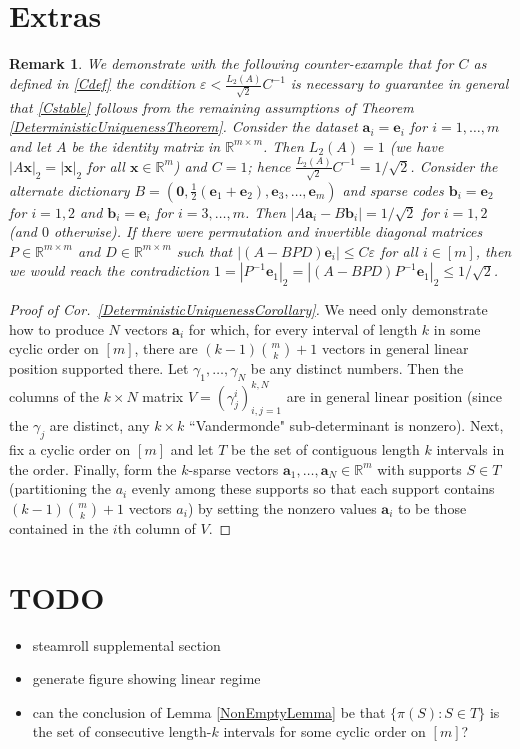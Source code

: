 \documentclass[journal, twocolumn]{IEEEtran}
\newtheorem{remark}{Remark}
\begin{document}
\section{Extras}

\begin{remark}
We demonstrate with the following counter-example that for $C$ as defined in \eqref{Cdef} the condition $\varepsilon < \frac{L_2(A)}{\sqrt{2}}C^{-1}$ is necessary to guarantee in general that \eqref{Cstable} follows from the remaining assumptions of Theorem \ref{DeterministicUniquenessTheorem}. Consider the dataset $\mathbf{a}_i = \mathbf{e}_i$ for $i = 1, \ldots, m$ and let $A$ be the identity matrix in $\mathbb{R}^{m \times m}$. Then $L_2(A) = 1$ (we have $|A\mathbf{x}|_2 = |\mathbf{x}|_2$ for all $\mathbf{x} \in \mathbb{R}^m$) and $C = 1$; hence $\frac{L_2(A)}{\sqrt{2}}C^{-1} = 1/\sqrt{2}$. Consider the alternate dictionary $B = \left(\mathbf{0}, \frac{1}{2}(\mathbf{e}_1 + \mathbf{e}_2), \mathbf{e}_3, \ldots, \mathbf{e}_{m} \right)$ and sparse codes $\mathbf{b}_i = \mathbf{e}_2$ for $i = 1, 2$ and $\mathbf{b}_i = \mathbf{e}_i$ for $i = 3, \ldots, m$. Then $|A\mathbf{a}_i - B\mathbf{b}_i| = 1/\sqrt{2}$ for $i = 1, 2$ (and $0$ otherwise). If there were permutation and invertible diagonal matrices $P \in \mathbb{R}^{m \times m}$ and $D \in \mathbb{R}^{m \times m}$ such that $|(A-BPD)\mathbf{e}_i| \leq C\varepsilon$ for all $i \in [m]$, then we would reach the contradiction $1 = |P^{-1}\mathbf{e}_1|_2 = |(A-BPD)P^{-1}\mathbf{e}_1|_2 \leq 1/\sqrt{2}$. 
\end{remark}

\begin{proof}[Proof of Cor.~\ref{DeterministicUniquenessCorollary}]
We need only demonstrate how to produce $N$ vectors $\mathbf{a}_i$ for which, for every interval of length $k$ in some cyclic order on $[m]$, there are  \mbox{$(k-1){m \choose k}+1$} vectors in general linear position supported there. Let $\gamma_1, \ldots, \gamma_N$ be any distinct numbers. Then the columns of the $k \times N$ matrix $V = (\gamma^i_j)^{k,N}_{i,j=1}$ are in general linear position (since the $\gamma_j$ are distinct, any $k \times k$ ``Vandermonde" sub-determinant is nonzero). Next, fix a cyclic order on $[m]$ and let $T$ be the set of contiguous length $k$ intervals in the order. Finally, form the $k$-sparse vectors $\mathbf{a}_1, \ldots, \mathbf{a}_N \in \mathbb{R}^m$ with supports $S \in T$ (partitioning the $a_i$ evenly among these supports so that each support contains $(k-1){m \choose k}+1$ vectors $a_i$) by setting the nonzero values $\mathbf{a}_i$ to be those contained in the $i$th column of $V$.
\end{proof}

\section{TODO}
\begin{itemize}
\item steamroll supplemental section
\item generate figure showing linear regime
\item can the conclusion of Lemma \ref{NonEmptyLemma} be that $\{ \pi(S): S \in T \}$ is the set of consecutive length-$k$ intervals for some cyclic order on $[m]$?
\end{itemize}
\end{document}

